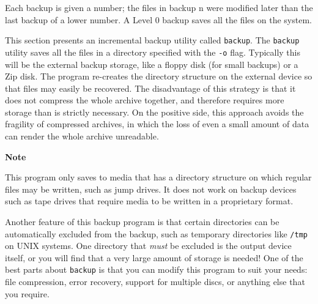 Each backup is given a number; the files in backup n were
modified later than the last backup of a lower number. A Level 0 backup
saves all the files on the system. 

This section presents an incremental backup utility called
\texttt{backup}. The \texttt{backup} utility saves all the files in a
directory specified with the \texttt{{}-o} flag. Typically this will be
the external backup storage, like a floppy disk (for small backups) or
a Zip disk. The program re-creates the directory structure on the
external device so that files may easily be recovered. The disadvantage
of this strategy is that it does not compress the whole archive
together, and therefore requires more storage than is strictly
necessary. On the positive side, this approach avoids the fragility of
compressed archives, in which the loss of even a small amount of data
can render the whole archive unreadable. 

{\sffamily\bfseries
Note}

{\sffamily
This program only saves to media that has a directory structure on which
regular files may be written, such as jump drives. It does not work on backup
devices such as tape drives that require media to be written in a
proprietary format.}

Another feature of this backup program is that certain directories can
be automatically excluded from the backup, such as temporary
directories like \texttt{/tmp} on UNIX systems. One directory that
{\em must\/} be excluded is the output device itself, or you will
find that a very large amount of storage is needed! One of the best
parts about \texttt{backup} is that you can modify this program to suit
your needs: file compression, error recovery, support for multiple
discs, or anything else that you require.

